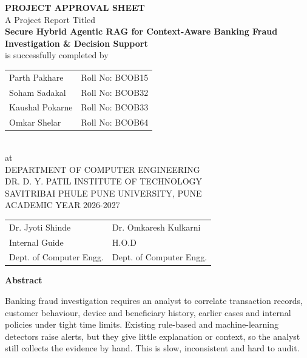 \documentclass[oneside,a4paper,12pt]{report}
\newcommand{\projtitle}{Secure Hybrid Agentic RAG for Context-Aware Banking Fraud Investigation \& Decision Support}
\begin{document}
\newpage
\thispagestyle{empty}
\begin{center}
{\bfseries \large PROJECT APPROVAL SHEET}\\[1.5em]
A Project Report Titled\\[0.5em]
{\bfseries \projtitle}\\[1.5em]
is successfully completed by\\[1em]
\begin{tabular}{l l}
Parth Pakhare   & \hspace{20mm} Roll No: BCOB15 \\
Soham Sadakal   & \hspace{20mm} Roll No: BCOB32 \\
Kaushal Pokarne & \hspace{20mm} Roll No: BCOB33 \\
Omkar Shelar    & \hspace{20mm} Roll No: BCOB64 \\
\end{tabular}\\[1.5em]
at\\[1em]
DEPARTMENT OF COMPUTER ENGINEERING\\
DR. D. Y. PATIL INSTITUTE OF TECHNOLOGY\\
SAVITRIBAI PHULE PUNE UNIVERSITY, PUNE\\[1em]
ACADEMIC YEAR 2026-2027\\[3em]
\begin{tabular}{p{} p{}}
Dr. Jyoti Shinde & \hfill Dr. Omkaresh Kulkarni \\
Internal Guide & \hfill H.O.D \\
Dept. of Computer Engg. & \hfill Dept. of Computer Engg. \\
\end{tabular}
\end{center}

\newpage
{}
\setcounter{page}{1}

\begin{center}{\bfseries \fontsize{14}{16}\selectfont Abstract}\end{center}
\vspace{1em}
\setlength{\parindent}{11mm}
\noindent Banking fraud investigation requires an analyst to correlate transaction records, customer behaviour, device and beneficiary history, earlier cases and internal policies under tight time limits. Existing rule-based and machine-learning detectors raise alerts, but they give little explanation or context, so the analyst still collects the evidence by hand. This is slow, inconsistent and hard to audit.
\end{document}
